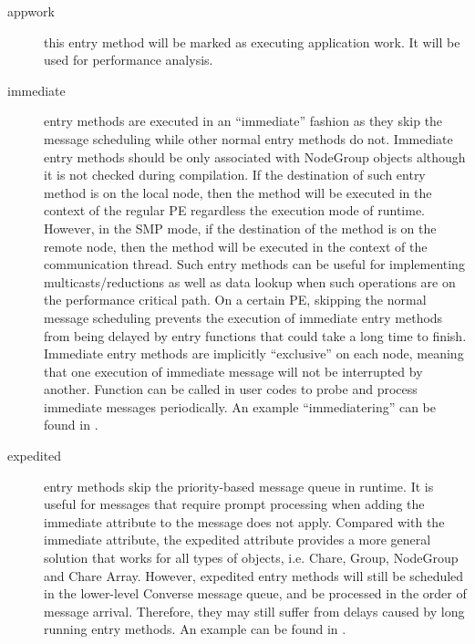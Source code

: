 \begin{description}
\item[appwork] this entry method will be marked as executing application work. It will be used for performance analysis.

\item[immediate] entry methods are executed in an
``immediate'' fashion as they skip the message scheduling while other normal
entry methods do not. Immediate entry methods should be only associated with
NodeGroup objects although it is not checked during compilation. If the
destination of such entry method is on the local node, then the method will be
executed in the context of the regular PE regardless the execution mode of
\charmpp{} runtime. However, in the SMP mode, if the destination of the method
is on the remote node, then the method will be executed in the context of the
communication thread.  
Such entry methods can be useful for implementing multicasts/reductions as well
as data lookup when such operations are on the performance critical path. On a
certain \charmpp{} PE, skipping the normal message scheduling prevents the
execution of immediate entry methods from being delayed by entry functions that
could take a long time to finish. Immediate entry methods are implicitly
``exclusive'' on each node, meaning that one execution of immediate message
will not be interrupted by another. Function  can be
called in user codes to probe and process immediate messages periodically. An
example ``immediatering'' can be found in .

\item[expedited] entry methods skip the priority-based message
queue in \charmpp{} runtime. It is useful for messages that require prompt
processing when adding the immediate attribute to the message does not apply.
Compared with the immediate attribute, the expedited attribute provides a more
general solution that works for all types of \charmpp{} objects, i.e. Chare,
Group, NodeGroup and Chare Array. However, expedited entry methods will still
be scheduled in the lower-level Converse message queue, and be processed in the
order of message arrival. Therefore, they may still suffer from delays caused
by long running entry methods. An example can be found in 
.



\end{description}

